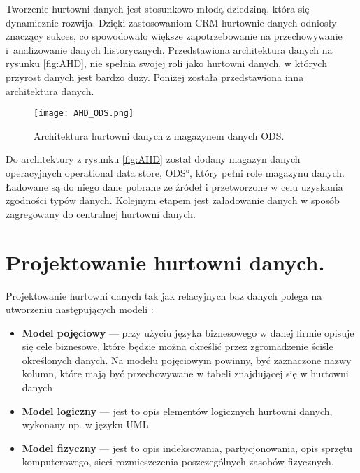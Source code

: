  
Tworzenie hurtowni danych jest stosunkowo młodą dziedziną, która się dynamicznie rozwija.
Dzięki zastosowaniom CRM hurtownie danych odniosły znaczący sukces, co spowodowało większe zapotrzebowanie na przechowywanie i~analizowanie danych historycznych. 
Przedstawiona architektura danych na rysunku \ref{fig:AHD}, nie spełnia swojej roli jako hurtowni danych, w których przyrost danych jest bardzo duży.
Poniżej została przedstawiona inna architektura danych.
\begin{center}
\begin{figure}[H]
  \begin{center}
    \texttt{[image: AHD\_ODS.png]}
  \end{center}
  \caption{Architektura hurtowni danych z magazynem danych ODS. }
    \label{fig:ODS}
\end{figure}
\end{center}

Do architektury z rysunku \ref{fig:AHD} został dodany magazyn danych operacyjnych \ang{operational data store, ODS}, który
pełni role magazynu danych. Ładowane są do niego dane pobrane ze źródeł i przetworzone w celu uzyskania zgodności typów danych.
Kolejnym etapem jest załadowanie danych w sposób zagregowany do centralnej hurtowni danych.


\section{Projektowanie hurtowni danych.}
Projektowanie hurtowni danych tak jak relacyjnych baz danych polega na utworzeniu następujących modeli \cite{TodMan}:

\begin{itemize}
 \item \textbf{Model pojęciowy} --- 
    przy użyciu języka biznesowego w danej firmie opisuje się cele biznesowe, 
    które będzie można określić przez zgromadzenie ściśle określonych danych.
   Na modelu pojęciowym powinny, być zaznaczone nazwy kolumn, które mają być przechowywane 
    w tabeli znajdującej się w hurtowni danych
 \item \textbf{Model logiczny} --- 
    jest to opis elementów  logicznych hurtowni danych, wykonany np. w języku UML.
 \item \textbf{Model fizyczny} --- 
    jest to opis indeksowania, partycjonowania, opis sprzętu komputerowego, sieci
     rozmieszczenia poszczególnych zasobów fizycznych.
\end{itemize}

